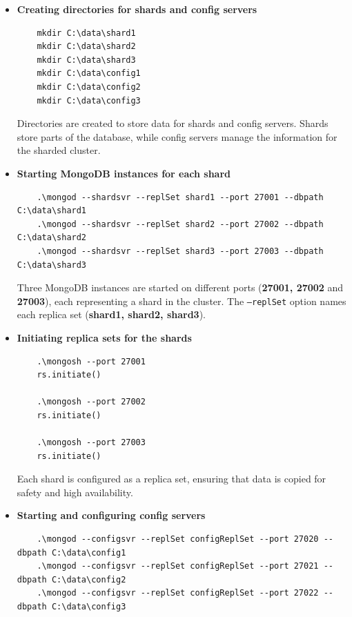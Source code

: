 \documentclass[a4paper,12pt]{article}
\begin{document}
\begin{itemize}
      \item \textbf{Creating directories for shards and config servers}

            \begin{lstlisting}
    mkdir C:\data\shard1
    mkdir C:\data\shard2
    mkdir C:\data\shard3
    mkdir C:\data\config1
    mkdir C:\data\config2
    mkdir C:\data\config3
    \end{lstlisting}

            Directories are created to store data for shards and config servers. Shards store parts of the database, while config servers manage the information for the sharded cluster.

      \item \textbf{Starting MongoDB instances for each shard}

            \begin{lstlisting}
    .\mongod --shardsvr --replSet shard1 --port 27001 --dbpath C:\data\shard1 
    .\mongod --shardsvr --replSet shard2 --port 27002 --dbpath C:\data\shard2 
    .\mongod --shardsvr --replSet shard3 --port 27003 --dbpath C:\data\shard3
    \end{lstlisting}

            Three MongoDB instances are started on different ports (\textbf{27001, 27002} and \textbf{27003}), each representing a shard in the cluster. The \texttt{--replSet} option names each replica set (\textbf{shard1, shard2, shard3}).


      \item \textbf{Initiating replica sets for the shards}

            \begin{lstlisting}
    .\mongosh --port 27001
    rs.initiate()

    .\mongosh --port 27002
    rs.initiate()

    .\mongosh --port 27003
    rs.initiate()
    \end{lstlisting}

            Each shard is configured as a replica set, ensuring that data is copied for safety and high availability.

      \item \textbf{Starting and configuring config servers}

            \begin{lstlisting}
    .\mongod --configsvr --replSet configReplSet --port 27020 --dbpath C:\data\config1 
    .\mongod --configsvr --replSet configReplSet --port 27021 --dbpath C:\data\config2
    .\mongod --configsvr --replSet configReplSet --port 27022 --dbpath C:\data\config3
    \end{lstlisting}


\end{itemize}
\end{document}
